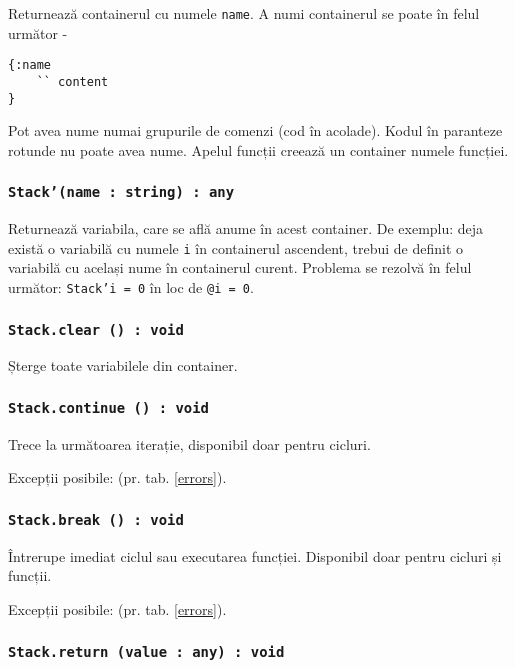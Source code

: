Returnează containerul cu numele \texttt{name}. A numi containerul se poate în felul următor -
\begin{verbatim}
{:name
	`` content
}
\end{verbatim}
Pot avea nume numai grupurile de comenzi (cod în acolade). Kodul în paranteze rotunde nu poate avea nume. Apelul funcții creează un container numele funcției.


\subsubsection{\texttt{Stack'(name : string) : any}}

Returnează variabila, care se află anume în acest container. De exemplu: deja există o variabilă cu numele \texttt{i} în containerul ascendent, trebui de definit o variabilă cu același nume în containerul curent. Problema se rezolvă în felul următor: \texttt{Stack'i = 0} în loc de \texttt{@i = 0}.

\subsubsection{\texttt{Stack.clear () : void}}

Șterge toate variabilele din container.

\subsubsection{\texttt{Stack.continue () : void}}

Trece la următoarea iterație, disponibil doar pentru cicluri.

Excepții posibile:  (pr. tab. \ref{errors}).

\subsubsection{\texttt{Stack.break () : void}}

Întrerupe imediat ciclul sau executarea funcției. Disponibil doar pentru cicluri și funcții.

Excepții posibile:  (pr. tab. \ref{errors}).

\subsubsection{\texttt{Stack.return (value : any) : void}}

